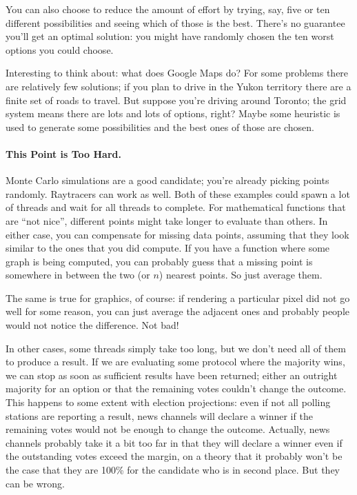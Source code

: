 You can also choose to reduce the amount of effort by trying, say, five or ten different possibilities and seeing which of those is the best. There's no guarantee you'll get an optimal solution: you might have randomly chosen the ten worst options you could choose. 

Interesting to think about: what does Google Maps do? For some problems there are relatively few solutions; if you plan to drive in the Yukon territory there are a finite set of roads to travel. But suppose you're driving around Toronto; the grid system means there are lots and lots of options, right? Maybe some heuristic is used to generate some possibilities and the best ones of those are chosen.


\paragraph{This Point is Too Hard.} Monte Carlo simulations
are a good candidate; you're already picking points randomly.
Raytracers can work as well. Both of these examples could spawn a lot
of threads and wait for all threads to complete. For mathematical functions that are ``not nice'', different points might take longer to evaluate than others. 
In either case, you
can compensate for missing data points, assuming that they look similar to
the ones that you did compute. If you have a function where some graph is being
computed, you can probably guess that a missing point is somewhere in between the two (or $n$) nearest points. So just average them.

The same is true for graphics, of course: if rendering a particular pixel did
not go well for some reason, you can just average the adjacent ones and probably
people would not notice the difference. Not bad!

In other cases, some threads simply take too long, but we don't need all of them to produce a result. If we are evaluating some protocol where the majority wins, we can stop as soon as sufficient results have been returned; either an outright majority for an option or that the remaining votes couldn't change the outcome. This happens to some extent with election projections: even if not all polling stations are reporting a result, news channels will declare a winner if the remaining votes would not be enough to change the outcome. Actually, news channels probably take it a bit too far in that they will declare a winner even if the outstanding votes exceed the margin, on a theory that it probably won't be the case that they are 100\% for the candidate who is in second place. But they can be wrong.

